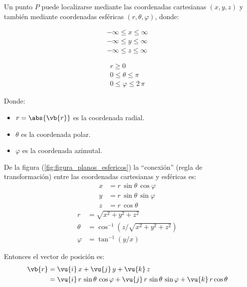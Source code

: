 Un punto $P$ puede localizarse mediante las coordenadas cartesianas \break \hfill $(x, y, z)$ y también mediante coordenadas esféricas $(r, \theta, \varphi)$, donde:

\begin{center}
\begin{minipage}{0.4\linewidth}
\begin{align*}
-\infty \le x \le \infty \\
-\infty \le y \le \infty \\
-\infty \le z \le \infty
\end{align*}
\end{minipage}
\hspace{1cm}
\begin{minipage}{0.4\linewidth}
\begin{align*}
r \geq 0 \\
0 \le \theta \le \pi \\
0 \le \varphi \le 2 \, \pi
\end{align*}
\end{minipage}
\end{center}
Donde:
\begin{itemize}
\item $r = \abs{\vb{r}}$ es la coordenada radial.
\item $\theta$ es la coordenada polar.
\item $\varphi$ es la coordenada azimutal.
\end{itemize}

De la figura (\ref{fig:figura_planos_esfericos}) la \enquote{conexión} (regla de transformación)  entre las coordenadas cartesianas y esféricas es:
\begin{align*}
x &= r \, \sin \theta \, \cos \varphi \\
y &= r \, \sin \theta \, \sin \varphi \\
z &= r \, \cos \theta
\end{align*}
\begin{align*}
r &= \sqrt{x^{2} + y^{2} + z^{2}} \\
\theta &= \cos^{-1} \left( z / \sqrt{x^{2} + y^{2} + z^{2}} \right) \\
\varphi &= \tan^{-1} (y/x)
\end{align*}

Entonces el vector de posición es:
\begin{align}
\begin{aligned}
\vb{r} &= \vu{i} \, x + \vu{j} \, y + \vu{k} \, z \\
&= \vu{i} \, r \, \sin \theta \, \cos \varphi + \vu{j} \, r \, \sin \theta \, \sin \varphi + \vu{k} \, r \cos \theta 
\end{aligned}
\label{eq:ecuacion_01_06}
\end{align}

